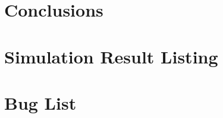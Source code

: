 \documentclass{report}
\begin{document}


\chapter{Conclusions}



\appendix

\chapter{Simulation Result Listing}


%

\chapter{Bug List}


\nocite{*}
\end{document}
